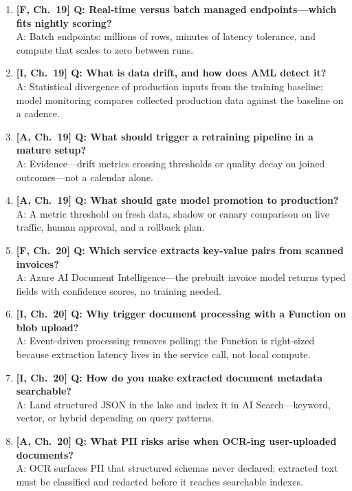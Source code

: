\begin{enumerate}
    A: Versioned identity with lineage to data, environment, code, and metrics---the answer to ``what exactly produced this artifact.''
    \item \textbf{[F, Ch.~19] Q: Real-time versus batch managed endpoints---which fits nightly scoring?}\\
    A: Batch endpoints: millions of rows, minutes of latency tolerance, and compute that scales to zero between runs.
    \item \textbf{[I, Ch.~19] Q: What is data drift, and how does AML detect it?}\\
    A: Statistical divergence of production inputs from the training baseline; model monitoring compares collected production data against the baseline on a cadence.
    \item \textbf{[A, Ch.~19] Q: What should trigger a retraining pipeline in a mature setup?}\\
    A: Evidence---drift metrics crossing thresholds or quality decay on joined outcomes---not a calendar alone.
    \item \textbf{[A, Ch.~19] Q: What should gate model promotion to production?}\\
    A: A metric threshold on fresh data, shadow or canary comparison on live traffic, human approval, and a rollback plan.
    \item \textbf{[F, Ch.~20] Q: Which service extracts key-value pairs from scanned invoices?}\\
    A: Azure AI Document Intelligence---the prebuilt invoice model returns typed fields with confidence scores, no training needed.
    \item \textbf{[I, Ch.~20] Q: Why trigger document processing with a Function on blob upload?}\\
    A: Event-driven processing removes polling; the Function is right-sized because extraction latency lives in the service call, not local compute.
    \item \textbf{[I, Ch.~20] Q: How do you make extracted document metadata searchable?}\\
    A: Land structured JSON in the lake and index it in AI Search---keyword, vector, or hybrid depending on query patterns.
    \item \textbf{[A, Ch.~20] Q: What PII risks arise when OCR-ing user-uploaded documents?}\\
    A: OCR surfaces PII that structured schemas never declared; extracted text must be classified and redacted before it reaches searchable indexes.
\end{enumerate}


